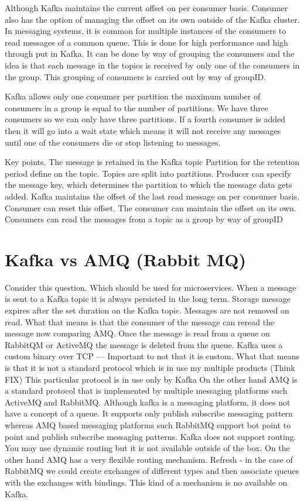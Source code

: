 Although Kafka maintains the current offset on per consumer basis.
Consumer also has the option of managing the offset on its own outside of the Kafka cluster.
In messaging systems, it is common for multiple instances of the consumers to read messages of a common queue.
This is done for high performance and high through put in Kafka.
It can be done by way of grouping the consumers and the idea is that each message in the topics is received by only one of the consumers in the group.
This grouping of consumers is carried out by way of groupID.

Kafka allows only one consumer per partition the maximum number of consumers in a group is equal to the number of partitions.
We have three consumers so we can only have three partitions.
If a fourth consumer is added then it will go into a wait state which means it will not receive any messages until one of the consumers die or stop listening to messages.

Key points.
The message is retained in the Kafka topic Partition for the retention period define on the topic.
Topics are split into partitions.
Producer can specify the message key, which determines the partition to which the message data gets added.
Kafka maintains the offset of the last read message on per consumer basis.
Consumer can reset this offset.
The consumer can maintain the offset on its own.
Consumers can read the messages from a topic as a group by way of groupID


\section{Kafka vs AMQ (Rabbit MQ)}
Consider this question. Which should be used for microservices.
When a message is sent to a Kafka topic it is always persisted in the long term.
Storage message expires after the set duration on the Kafka topic.
Messages are not removed on read.
What that means is that the consumer of the message can reread the message now comparing AMQ.
Once the message is read from a queue on RabbitQM or ActiveMQ the message is deleted from the queue.
Kafka uses a custom binary over TCP
--- Important to not that it is custom.
What that means is that it is not a standard protocol which is in use my multiple products (Think FIX)
This particular protocol is in use only by Kafka
On the other hand AMQ is a standard protocol that is implemented by multiple messaging platforms such ActiveMQ and RabbitMQ.
Although kafka is a messaging platform, it does not have a concept of a queue.
It supports only publish subscribe messaging pattern whereas AMQ based messaging platforms such RabbitMQ support bot point to point and publish subscribe messaging patterns.
Kafka does not support routing.
You may use dynamic routing but it is not available outside of the box.
On the other hand AMQ has a very flexible routing mechanism.
Refresh - in the case of RabbitMQ we could create exchanges of different types and then associate queues with the exchanges with bindings.
This kind of a mechanism is no available on Kafka.

